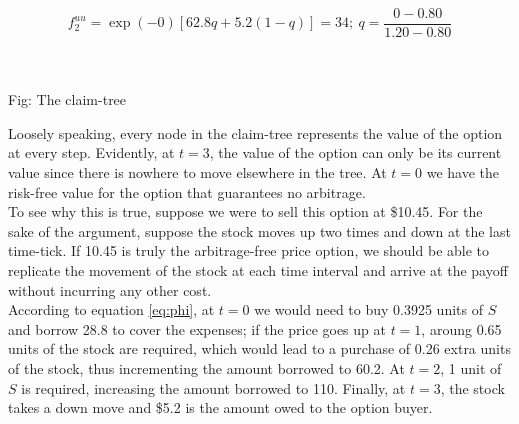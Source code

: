 \documentclass{article}
\begin{document}
\begin{equation*}
    f^{uu}_2 = \exp(-0)[62.8q + 5.2(1-q)] = 34; \  q = \frac{0 - 0.80}{1.20 - 0.80}
\end{equation*}\\

\begin{center}
\\
    \caption{Fig: The claim-tree} 
\end{center}

Loosely speaking, every node in the claim-tree represents the value of the option at every step. Evidently, at $t=3$, the value of the option can only be its current value since there is nowhere to move elsewhere in the tree. At $t=0$ we have the risk-free value for the option that guarantees no arbitrage.\\

To see why this is true, suppose we were to sell this option at \$10.45. For the sake of the argument, suppose the stock moves up two times and down at the last time-tick. If 10.45 is truly the arbitrage-free price option, we should be able to replicate the movement of the stock at each time interval and arrive at the payoff without incurring any other cost.\\

According to equation \ref{eq:phi}, at $t=0$ we would need to buy 0.3925 units of $S$ and borrow 28.8 to cover the expenses; if the price goes up at $t=1$, aroung 0.65 units of the stock are required, which would lead to a purchase of 0.26 extra units of the stock, thus incrementing the amount borrowed to 60.2. At $t=2$, 1 unit of $S$ is required, increasing the amount borrowed to 110. Finally, at $t=3$, the stock takes a down move and \$5.2 is the amount owed to the option buyer. \\
\end{document}
